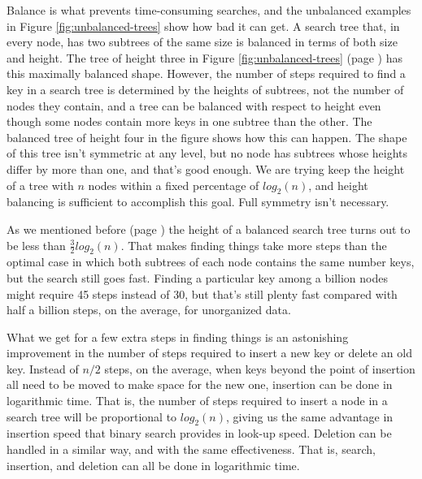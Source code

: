 Balance is what prevents time-consuming searches, and the unbalanced
examples in Figure \ref{fig:unbalanced-trees} show how bad it can get.
A search tree that, in every node, has two subtrees of the same size
is balanced in terms of both size and height. The tree of height three
in Figure \ref{fig:unbalanced-trees} (page \pageref{fig:unbalanced-trees})
has this maximally balanced shape.
However, the number of steps
required to find a key in a search tree is determined by the heights of subtrees,
not the number of nodes they contain, and
a tree can be balanced with respect to height even though some nodes contain
more keys in one subtree than the other.
The balanced tree of height four in the figure shows how this can happen.
The shape of this tree isn't symmetric at any level,
but no node has subtrees whose heights differ by more than one,
and that's good enough.
We are trying keep the height of a tree with $n$ nodes
within a fixed percentage of $log_2(n)$,
and height balancing is sufficient to accomplish this goal.
Full symmetry isn't necessary. %

As we mentioned before (page \pageref{50pct-thm})
the height of a balanced search tree
turns out to be less than $\frac{3}{2} log_2(n)$.
That makes finding things take more
steps than the optimal case in which both subtrees of
each node contains the same number keys,
but the search still goes fast.
Finding a particular key among a billion nodes
might require 45 steps instead of 30, but that's %
still plenty fast compared with half a billion steps,
on the average, for unorganized data.

What we get for a few extra steps in finding things is
an astonishing improvement in the number of steps required
to insert a new key or delete an old key.
Instead of $n/2$ steps, on the average,
when keys beyond the point of insertion
all need to be moved to make space for the new one,
insertion can be done in logarithmic time.
That is, the number of steps required to insert
a node in a search tree will be proportional to $log_2(n)$,
giving us the same advantage in insertion speed
that binary search provides in look-up speed.
Deletion can be handled in a similar way, and with the same effectiveness.
That is, search, insertion, and deletion can all be done in logarithmic time.

\begin{exercises}
\end{exercises}


